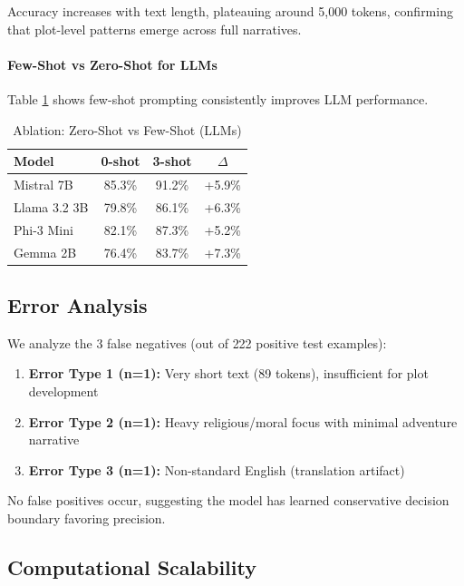 \documentclass[11pt]{article}
\begin{document}
Accuracy increases with text length, plateauing around 5,000 tokens, confirming that plot-level patterns emerge across full narratives.

\paragraph{Few-Shot vs Zero-Shot for LLMs}
Table \ref{tab:ablation_shots} shows few-shot prompting consistently improves LLM performance.

\begin{table}[h]
\centering
\small
\caption{Ablation: Zero-Shot vs Few-Shot (LLMs)}
\label{tab:ablation_shots}
\begin{tabular}{lccc}
\toprule
\textbf{Model} & \textbf{0-shot} & \textbf{3-shot} & \textbf{$\Delta$} \\
\midrule
Mistral 7B & 85.3\% & 91.2\% & +5.9\% \\
Llama 3.2 3B & 79.8\% & 86.1\% & +6.3\% \\
Phi-3 Mini & 82.1\% & 87.3\% & +5.2\% \\
Gemma 2B & 76.4\% & 83.7\% & +7.3\% \\
\bottomrule
\end{tabular}
\end{table}

\subsection{Error Analysis}

We analyze the 3 false negatives (out of 222 positive test examples):

\begin{enumerate}
    \item \textbf{Error Type 1 (n=1):} Very short text (89 tokens), insufficient for plot development
    \item \textbf{Error Type 2 (n=1):} Heavy religious/moral focus with minimal adventure narrative
    \item \textbf{Error Type 3 (n=1):} Non-standard English (translation artifact)
\end{enumerate}

No false positives occur, suggesting the model has learned conservative decision boundary favoring precision.

\subsection{Computational Scalability}
\end{document}

